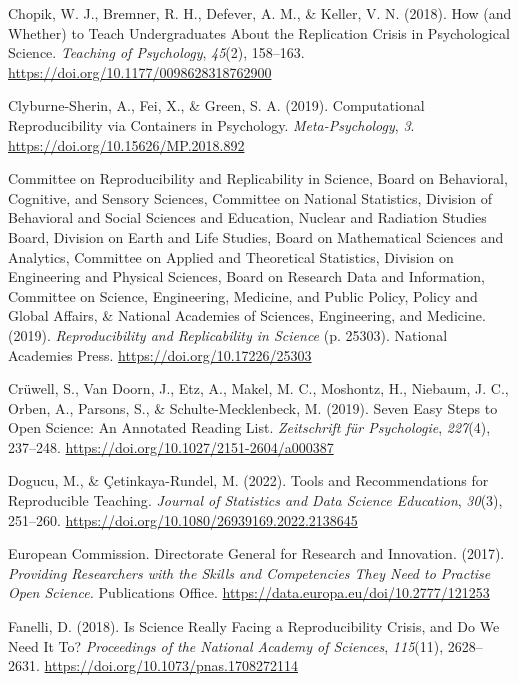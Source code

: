 \documentclass[
  a4paper,
]{book}
\newlength{\cslhangindent}
\newenvironment{CSLReferences}[2] %
 {\begin{list}{}{%
  \setlength{\itemindent}{0pt}
  \setlength{\leftmargin}{0pt}
  \setlength{\parsep}{0pt}
  \ifodd #1
   \setlength{\leftmargin}{\cslhangindent}
   \setlength{\itemindent}{-1\cslhangindent}
  \fi
  \setlength{\itemsep}{#2\baselineskip}}}
 {\end{list}}
\begin{document}
\begin{CSLReferences}{1}{0}
Chopik, W. J., Bremner, R. H., Defever, A. M., \& Keller, V. N. (2018).
How (and {Whether}) to {Teach Undergraduates About} the {Replication
Crisis} in {Psychological Science}. \emph{Teaching of Psychology},
\emph{45}(2), 158--163. \url{https://doi.org/10.1177/0098628318762900}

Clyburne-Sherin, A., Fei, X., \& Green, S. A. (2019). Computational
{Reproducibility} via {Containers} in {Psychology}.
\emph{Meta-Psychology}, \emph{3}.
\url{https://doi.org/10.15626/MP.2018.892}

Committee on Reproducibility and Replicability in Science, Board on
Behavioral, Cognitive, and Sensory Sciences, Committee on National
Statistics, Division of Behavioral and Social Sciences and Education,
Nuclear and Radiation Studies Board, Division on Earth and Life Studies,
Board on Mathematical Sciences and Analytics, Committee on Applied and
Theoretical Statistics, Division on Engineering and Physical Sciences,
Board on Research Data and Information, Committee on Science,
Engineering, Medicine, and Public Policy, Policy and Global Affairs, \&
National Academies of Sciences, Engineering, and Medicine. (2019).
\emph{Reproducibility and {Replicability} in {Science}} (p. 25303).
National Academies Press. \url{https://doi.org/10.17226/25303}

Crüwell, S., Van Doorn, J., Etz, A., Makel, M. C., Moshontz, H.,
Niebaum, J. C., Orben, A., Parsons, S., \& Schulte-Mecklenbeck, M.
(2019). Seven {Easy Steps} to {Open Science}: {An Annotated Reading
List}. \emph{Zeitschrift f{ü}r Psychologie}, \emph{227}(4), 237--248.
\url{https://doi.org/10.1027/2151-2604/a000387}

Dogucu, M., \& Çetinkaya-Rundel, M. (2022). Tools and {Recommendations}
for {Reproducible Teaching}. \emph{Journal of Statistics and Data
Science Education}, \emph{30}(3), 251--260.
\url{https://doi.org/10.1080/26939169.2022.2138645}

European Commission. Directorate General for Research and Innovation.
(2017). \emph{Providing Researchers with the Skills and Competencies
They Need to Practise {Open Science}.} Publications Office.
\url{https://data.europa.eu/doi/10.2777/121253}

Fanelli, D. (2018). Is Science Really Facing a Reproducibility Crisis,
and Do We Need It To? \emph{Proceedings of the National Academy of
Sciences}, \emph{115}(11), 2628--2631.
\url{https://doi.org/10.1073/pnas.1708272114}


\end{CSLReferences}
\end{document}
